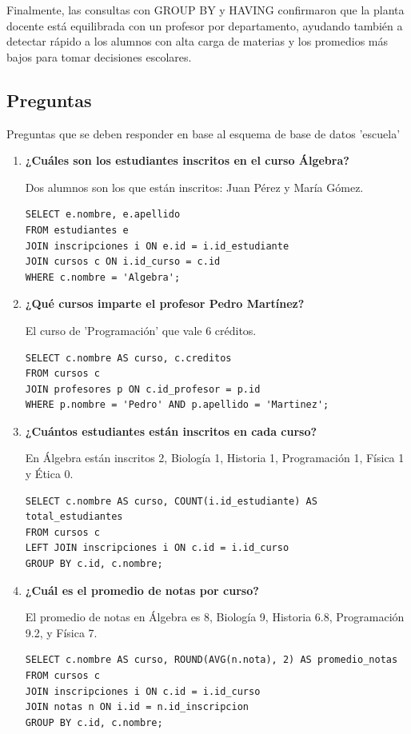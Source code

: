\documentclass[11pt,letterpaper]{article}
\begin{document}
Finalmente, las consultas con GROUP BY y HAVING confirmaron que la planta docente está equilibrada con un profesor por departamento, ayudando también a detectar rápido a los alumnos con alta carga de materias y los promedios más bajos para tomar decisiones escolares.
\subsection{Preguntas}
Preguntas que se deben responder en base al esquema de base de datos 'escuela'\\

\begin{enumerate}
    \item \textbf{¿Cuáles son los estudiantes inscritos en el curso Álgebra?}
    
    Dos alumnos son los que están inscritos: Juan Pérez y María Gómez.
\begin{lstlisting}
SELECT e.nombre, e.apellido 
FROM estudiantes e
JOIN inscripciones i ON e.id = i.id_estudiante
JOIN cursos c ON i.id_curso = c.id
WHERE c.nombre = 'Algebra';
\end{lstlisting}

    \item \textbf{¿Qué cursos imparte el profesor Pedro Martínez?}
    
    El curso de 'Programación' que vale 6 créditos.
\begin{lstlisting}
SELECT c.nombre AS curso, c.creditos 
FROM cursos c
JOIN profesores p ON c.id_profesor = p.id
WHERE p.nombre = 'Pedro' AND p.apellido = 'Martinez';
\end{lstlisting}

    \item \textbf{¿Cuántos estudiantes están inscritos en cada curso?}
    
    En Álgebra están inscritos 2, Biología 1, Historia 1, Programación 1, Física 1 y Ética 0.
\begin{lstlisting}
SELECT c.nombre AS curso, COUNT(i.id_estudiante) AS total_estudiantes
FROM cursos c
LEFT JOIN inscripciones i ON c.id = i.id_curso
GROUP BY c.id, c.nombre;
\end{lstlisting}

    \item \textbf{¿Cuál es el promedio de notas por curso?}
    
    El promedio de notas en Álgebra es 8, Biología 9, Historia 6.8, Programación 9.2, y Física 7.
\begin{lstlisting}
SELECT c.nombre AS curso, ROUND(AVG(n.nota), 2) AS promedio_notas
FROM cursos c
JOIN inscripciones i ON c.id = i.id_curso
JOIN notas n ON i.id = n.id_inscripcion
GROUP BY c.id, c.nombre;
\end{lstlisting}


\end{enumerate}
\end{document}
